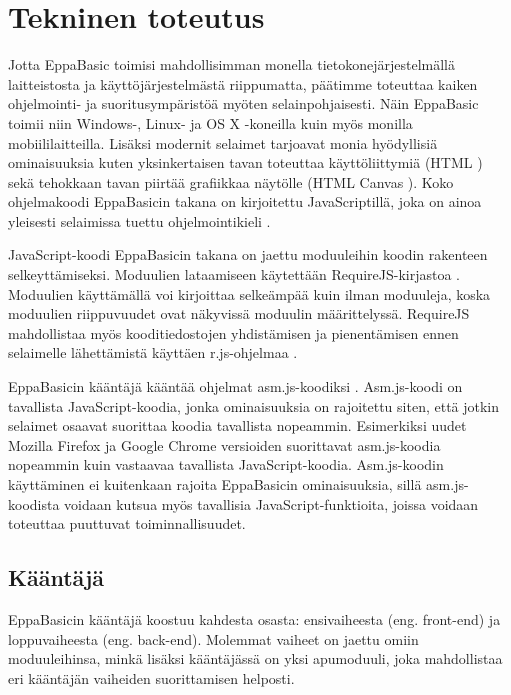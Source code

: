 
\section{Tekninen toteutus}
Jotta EppaBasic toimisi mahdollisimman monella
tietokonejärjestelmällä laitteistosta ja
käyttöjärjestelmästä riippumatta,
päätimme toteuttaa kaiken ohjelmointi-
ja suoritusympäristöä myöten
selainpohjaisesti.
Näin EppaBasic toimii niin
Windows-, Linux- ja OS X -koneilla
kuin myös monilla mobiililaitteilla.
Lisäksi modernit selaimet tarjoavat
monia hyödyllisiä ominaisuuksia
kuten yksinkertaisen tavan toteuttaa
käyttöliittymiä (HTML \cite{w3c_html})
sekä tehokkaan tavan piirtää grafiikkaa
näytölle (HTML Canvas \cite{mdn_canvas}).
Koko ohjelmakoodi EppaBasicin takana
on kirjoitettu JavaScriptillä,
joka on ainoa yleisesti selaimissa
tuettu ohjelmointikieli \cite{mdn_about_js}.

JavaScript-koodi EppaBasicin takana
on jaettu moduuleihin koodin
rakenteen selkeyttämiseksi.
Moduulien lataamiseen käytettään
RequireJS-kirjastoa \cite{requirejs}.
Moduulien käyttämällä voi kirjoittaa
selkeämpää kuin ilman moduuleja,
koska moduulien riippuvuudet ovat
näkyvissä moduulin määrittelyssä.
RequireJS mahdollistaa myös kooditiedostojen
yhdistämisen ja pienentämisen ennen selaimelle
lähettämistä käyttäen r.js-ohjelmaa \cite{r.js}.

EppaBasicin kääntäjä kääntää ohjelmat
asm.js-koodiksi \cite{asm.js}.
Asm.js-koodi on tavallista
JavaScript-koodia, jonka
ominaisuuksia on rajoitettu siten,
että jotkin selaimet osaavat
suorittaa koodia tavallista
nopeammin.
Esimerkiksi uudet Mozilla Firefox
ja Google Chrome versioiden
suorittavat
asm.js-koodia nopeammin
kuin vastaavaa tavallista
JavaScript-koodia.
Asm.js-koodin käyttäminen
ei kuitenkaan rajoita
EppaBasicin ominaisuuksia,
sillä asm.js-koodista
voidaan kutsua myös
tavallisia JavaScript-funktioita,
joissa voidaan toteuttaa
puuttuvat toiminnallisuudet.


\subsection{Kääntäjä}
EppaBasicin kääntäjä koostuu kahdesta osasta:
ensivaiheesta (eng. front-end) ja
loppuvaiheesta (eng. back-end).
Molemmat vaiheet on jaettu omiin moduuleihinsa,
minkä lisäksi kääntäjässä on yksi apumoduuli,
joka mahdollistaa eri kääntäjän vaiheiden
suorittamisen helposti.

